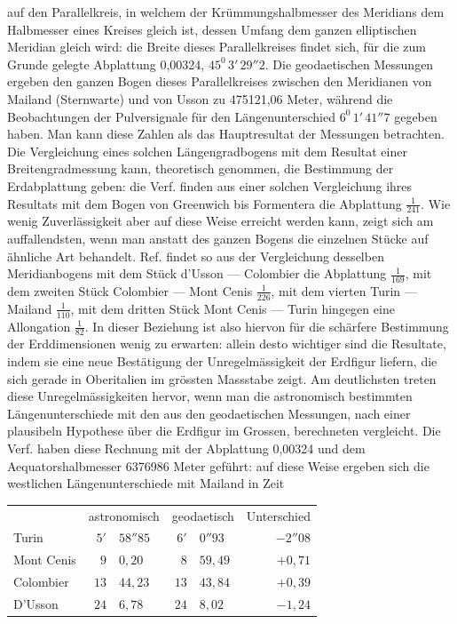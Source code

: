 %
auf den Parallelkreis, in welchem der Krümmungshalbmesser des Meridians dem Halbmesser eines Kreises gleich ist, dessen Umfang dem ganzen elliptischen Meridian gleich wird: die Breite dieses Parallelkreises findet sich, für die zum Grunde gelegte Abplattung 0,00324, \(45^0\,3'\,29''2\). Die geodaetischen Messungen ergeben den ganzen Bogen dieses Parallelkreises zwischen den Meridianen von Mailand (Sternwarte) und von Usson zu 475121,06 Meter, während die Beobachtungen der Pulversignale für den Längenunterschied \(6^0\,1'\,41''7\) gegeben haben. Man kann diese Zahlen als das Hauptresultat der Messungen betrachten. Die Vergleichung eines solchen Längengradbogens mit dem Resultat einer Breitengradmessung kann, theoretisch genommen, die Bestimmung der Erdabplattung geben: die Verf. finden aus einer solchen Vergleichung ihres Resultats mit dem Bogen von Greenwich bis Formentera die Abplattung \(\frac{1}{241}\). Wie wenig Zuverlässigkeit aber auf diese Weise erreicht werden kann, zeigt sich am auffallendsten, wenn man anstatt des ganzen Bogens die einzelnen Stücke auf ähnliche Art behandelt. Ref. findet so aus der Vergleichung desselben Meridianbogens mit dem Stück d’Usson --- Colombier die Abplattung \(\frac{1}{169}\), mit dem zweiten Stück Colombier --- Mont Cenis \(\frac{1}{226}\), mit dem vierten Turin --- Mailand \(\frac{1}{110}\), mit dem dritten Stück Mont Cenis --- Turin hingegen eine Allongation \(\frac{1}{82}\). In dieser Beziehung ist also hiervon für die schärfere Bestimmung der Erddimensionen wenig zu erwarten: allein desto wichtiger sind die Resultate, indem sie eine neue Bestätigung der Unregelmässigkeit der Erdfigur liefern, die sich gerade in Oberitalien im grössten Massstabe zeigt. Am deutlichsten treten diese Unregelmässigkeiten hervor, wenn man die astronomisch bestimmten Längenunterschiede mit den aus den geodaetischen Messungen, nach einer plausibeln Hypothese über die Erdfigur im Grossen, berechneten vergleicht. Die Verf. haben diese Rechnung mit der Abplattung 0,00324 und dem Aequatorshalbmesser 6376986 Meter geführt: auf diese Weise ergeben sich die westlichen Längenunterschiede mit Mailand in Zeit
\begin{center}
\begin{tabular}{l|r@{\quad}l|r@{\quad}l|r}
&\multicolumn{2}{c|}{astronomisch}&\multicolumn{2}{c|}{geodaetisch}&Unterschied\\
Turin & \(5'\) & \(58''85\) & \(6'\) & \(0''93\) & \(-2''08\)\\
Mont Cenis & \(9\) & \(0,20\) & \(8\) & \(59,49\) & \(+0,71\)\\
Colombier & \(13\) & \(44,23\) & \(13\) & \(43,84\) & \(+0,39\)\\
D’Usson & \(24\) & \(6,78\) & \(24\) & \(8,02\) & \(-1,24\)
\end{tabular}
\end{center}
